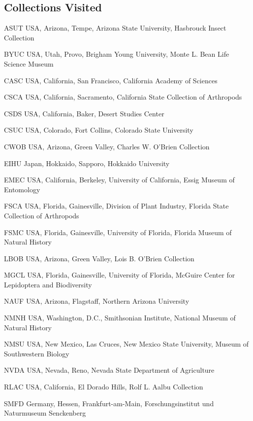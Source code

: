 \documentclass[12pt,a4paper]{article}
\begin{document}
\subsection*{Collections Visited}
\begin{collections}
	\item [ASUT] USA, Arizona, Tempe, Arizona State University, Hasbrouck Insect Collection
	\item [BYUC] USA, Utah, Provo, Brigham Young University, Monte L. Bean Life Science Museum
	\item [CASC] USA, California, San Francisco, California Academy of Sciences
	\item [CSCA] USA, California, Sacramento, California State Collection of Arthropods
	\item [CSDS] USA, California, Baker, Desert Studies Center
	\item [CSUC] USA, Colorado, Fort Collins, Colorado State University
	\item [CWOB] USA, Arizona, Green Valley, Charles W. O'Brien Collection
	\item [EIHU] Japan, Hokkaido, Sapporo, Hokkaido University
	\item [EMEC] USA, California, Berkeley, University of California, Essig Museum of Entomology
	\item [FSCA] USA, Florida, Gainesville, Division of Plant Industry, Florida State Collection of Arthropods
	\item [FSMC] USA, Florida, Gainesville, University of Florida, Florida Museum of Natural History
	\item [LBOB] USA, Arizona, Green Valley, Lois B. O'Brien Collection
	\item [MGCL] USA, Florida, Gainesville, University of Florida, McGuire Center for Lepidoptera and Biodiversity
	\item [NAUF] USA, Arizona, Flagstaff, Northern Arizona University
	\item [NMNH] USA, Washington, D.C., Smithsonian Institute, National Museum of Natural History
	\item [NMSU] USA, New Mexico, Las Cruces, New Mexico State University, Museum of Southwestern Biology
	\item [NVDA] USA, Nevada, Reno, Nevada State Department of Agriculture
	\item [RLAC] USA, California, El Dorado Hills, Rolf L. Aalbu Collection
	\item [SMFD] Germany, Hessen, Frankfurt-am-Main, Forschungsinstitut und Naturmuseum Senckenberg

\end{collections}
\end{document}
